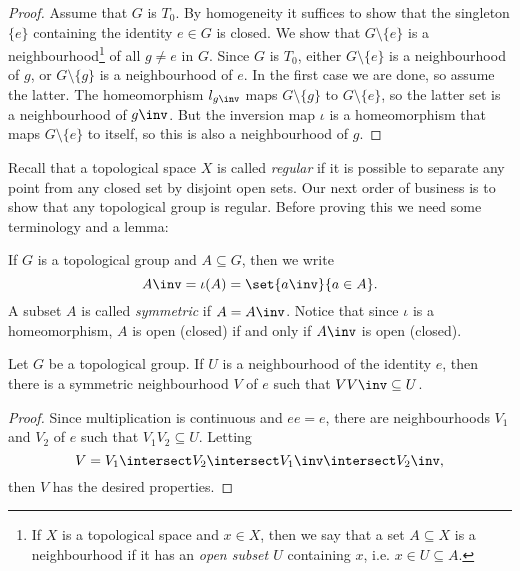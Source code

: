\documentclass[article, a4paper, 11pt, oneside]{memoir}
\numberwithin{equation}{chapter}
\begin{document}
\begin{proof}
    Assume that $G$ is $T_0$. By homogeneity it suffices to show that the singleton $\{e\}$ containing the identity $e \in G$ is closed. We show that $G \setminus \{e\}$ is a neighbourhood\footnote{If $X$ is a topological space and $x \in X$, then we say that a set $A \subseteq X$ is a neighbourhood if it has an \emph{open subset $U$} containing $x$, i.e. $x \in U \subseteq A$.} of all $g \neq e$ in $G$. Since $G$ is $T_0$, either $G \setminus \{e\}$ is a neighbourhood of $g$, or $G \setminus \{g\}$ is a neighbourhood of $e$. In the first case we are done, so assume the latter. The homeomorphism $l_{g\inv}$ maps $G \setminus \{g\}$ to $G \setminus \{e\}$, so the latter set is a neighbourhood of $g\inv$. But the inversion map $\iota$ is a homeomorphism that maps $G \setminus \{e\}$ to itself, so this is also a neighbourhood of $g$.
\end{proof}

Recall that a topological space $X$ is called \emph{regular} if it is possible to separate any point from any closed set by disjoint open sets. Our next order of business is to show that any topological group is regular. Before proving this we need some terminology and a lemma:

If $G$ is a topological group and $A \subseteq G$, then we write
%
\begin{equation*}
    A\inv = \iota(A) = \set{a\inv}{a \in A}.
\end{equation*}
%
A subset $A$ is called \emph{symmetric} if $A = A\inv$. Notice that since $\iota$ is a homeomorphism, $A$ is open (closed) if and only if $A\inv$ is open (closed).

\begin{lemma}
    \label{thm:symmetric_nhood_of_e}
    Let $G$ be a topological group. If $U$ is a neighbourhood of the identity $e$, then there is a symmetric neighbourhood $V$ of $e$ such that $V V\inv \subseteq U$.
\end{lemma}

\begin{proof}
    Since multiplication is continuous and $ee = e$, there are neighbourhoods $V_1$ and $V_2$ of $e$ such that $V_1 V_2 \subseteq U$. Letting
    \begin{equation*}
        V = V_1 \intersect V_2 \intersect V_1\inv \intersect V_2\inv,
    \end{equation*}
    then $V$ has the desired properties.
\end{proof}
\end{document}
